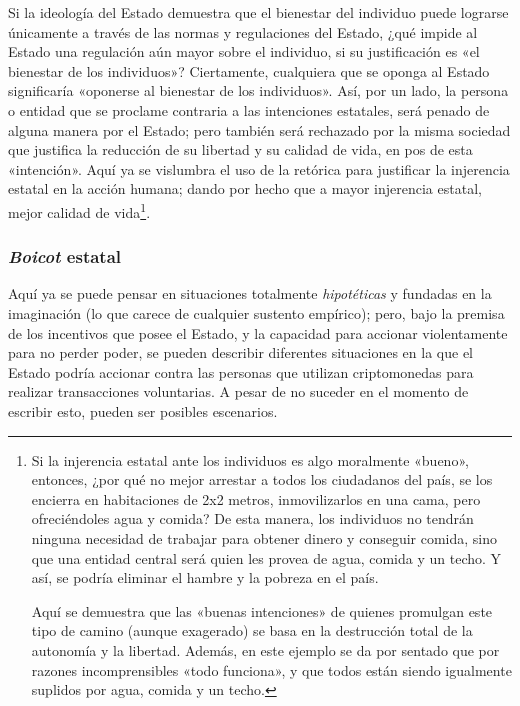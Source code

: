 \documentclass[12pt,a4paper,twoside]{book}
\begin{document}
Si la ideología del Estado demuestra que el bienestar del individuo puede lograrse únicamente a través de las normas y regulaciones del Estado, ¿qué impide al Estado una regulación aún mayor sobre el individuo, si su justificación es «el bienestar de los individuos»? Ciertamente, cualquiera que se oponga al Estado significaría «oponerse al bienestar de los individuos». Así, por un lado, la persona o entidad que se proclame contraria a las intenciones estatales, será penado de alguna manera por el Estado; pero también será rechazado por la misma sociedad que justifica la reducción de su libertad y su calidad de vida, en pos de esta «intención». Aquí ya se vislumbra el uso de la retórica para justificar la injerencia estatal en la acción humana; dando por hecho que a mayor injerencia estatal, mejor calidad de vida\footnote{Si la injerencia estatal ante los individuos es algo moralmente «bueno», entonces, ¿por qué no mejor arrestar a todos los ciudadanos del país, se los encierra en habitaciones de 2x2 metros, inmovilizarlos en una cama, pero ofreciéndoles agua y comida? De esta manera, los individuos no tendrán ninguna necesidad de trabajar para obtener dinero y conseguir comida, sino que una entidad central será quien les provea de agua, comida y un techo. Y así, se podría eliminar el hambre y la pobreza en el país. 

Aquí se demuestra que las «buenas intenciones» de quienes promulgan este tipo de camino (aunque exagerado) se basa en la destrucción total de la autonomía y la libertad. Además, en este ejemplo se da por sentado que por razones incomprensibles «todo funciona», y que todos están siendo igualmente suplidos por agua, comida y un techo.}.

\subsubsection{\textit{Boicot} estatal}
Aquí ya se puede pensar en situaciones totalmente \textit{hipotéticas} y fundadas en la imaginación (lo que carece de cualquier sustento empírico); pero, bajo la premisa de los incentivos que posee el Estado, y la capacidad para accionar violentamente para no perder poder, se pueden describir diferentes situaciones en la que el Estado podría accionar contra las personas que utilizan criptomonedas para realizar transacciones voluntarias. A pesar de no suceder en el momento de escribir esto, pueden ser posibles escenarios.
\end{document}
